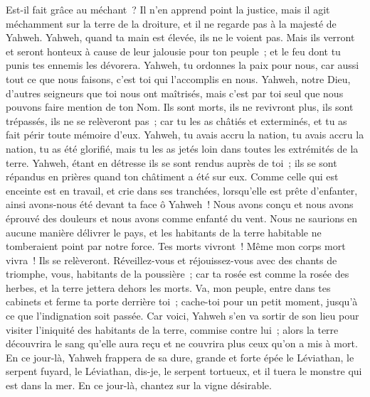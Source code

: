 \begin{multicols}{2}
Est-il fait grâce au méchant~? Il n'en apprend point la justice, mais il agit méchamment sur la terre de la droiture, et il ne regarde pas à la majesté de Yahweh.
Yahweh, quand ta main est élevée, ils ne le voient pas. Mais ils verront et seront honteux à cause de leur jalousie pour ton peuple~; et le feu dont tu punis tes ennemis les dévorera.
Yahweh, tu ordonnes la paix pour nous, car aussi tout ce que nous faisons, c'est toi qui l'accomplis en nous.
Yahweh, notre Dieu, d'autres seigneurs que toi nous ont maîtrisés, mais c'est par toi seul que nous pouvons faire mention de ton Nom.
Ils sont morts, ils ne revivront plus, ils sont trépassés, ils ne se relèveront pas~; car tu les as châtiés et exterminés, et tu as fait périr toute mémoire d'eux.
Yahweh, tu avais accru la nation, tu avais accru la nation, tu as été glorifié, mais tu les as jetés loin dans toutes les extrémités de la terre.
Yahweh, étant en détresse ils se sont rendus auprès de toi~; ils se sont répandus en prières quand ton châtiment a été sur eux.
Comme celle qui est enceinte est en travail, et crie dans ses tranchées, lorsqu'elle est prête d'enfanter, ainsi avons-nous été devant ta face ô Yahweh~!
Nous avons conçu et nous avons éprouvé des douleurs et nous avons comme enfanté du vent. Nous ne saurions en aucune manière délivrer le pays, et les habitants de la terre habitable ne tomberaient point par notre force.
Tes morts vivront~! Même mon corps mort vivra~! Ils se relèveront. Réveillez-vous et réjouissez-vous avec des chants de triomphe, vous, habitants de la poussière~; car ta rosée est comme la rosée des herbes, et la terre jettera dehors les morts.
Va, mon peuple, entre dans tes cabinets et ferme ta porte derrière toi~; cache-toi pour un petit moment, jusqu'à ce que l'indignation soit passée.
Car voici, Yahweh s'en va sortir de son lieu pour visiter l'iniquité des habitants de la terre, commise contre lui~; alors la terre découvrira le sang qu'elle aura reçu et ne couvrira plus ceux qu'on a mis à mort.
\VerseOne{}En ce jour-là, Yahweh frappera de sa dure, grande et forte épée le Léviathan, le serpent fuyard, le Léviathan, dis-je, le serpent tortueux, et il tuera le monstre qui est dans la mer.
En ce jour-là, chantez sur la vigne désirable.

\end{multicols}
